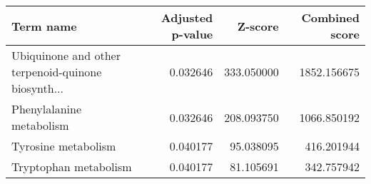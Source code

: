 \begin{tabular}{lrrr}
\toprule
                                         Term name &  Adjusted p-value &    Z-score &  Combined score \\
\midrule
Ubiquinone and other terpenoid-quinone biosynth... &          0.032646 & 333.050000 &     1852.156675 \\
                          Phenylalanine metabolism &          0.032646 & 208.093750 &     1066.850192 \\
                               Tyrosine metabolism &          0.040177 &  95.038095 &      416.201944 \\
                             Tryptophan metabolism &          0.040177 &  81.105691 &      342.757942 \\
\bottomrule
\end{tabular}
